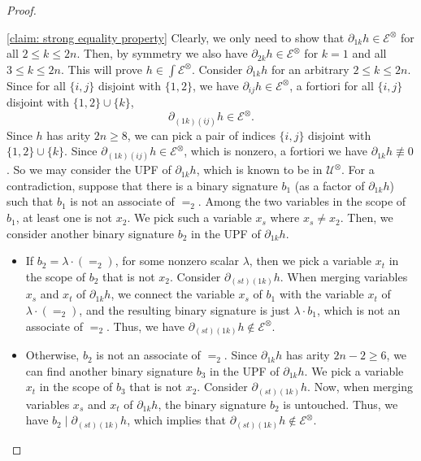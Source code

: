 \begin{proof}
\begin{claimproof}{\cref{claim: strong equality property}}
    Clearly, we only need to show that ${\partial}_{1k}{h}\in {\mathcal{E}}^{\otimes}$ for all $2 \leqslant k \leqslant 2n$. Then, by symmetry we also have ${\partial}_{2k}{h}\in {\mathcal{E}}^{\otimes}$ for $k=1$ and all $3 \leqslant k \leqslant 2n$. This will prove ${h}\in {\int}{\mathcal{E}}^{\otimes}.$
    Consider ${\partial}_{1k}{h}$ for an arbitrary $2\leqslant k \leqslant 2n$.
   Since for all $\{i, j\}$ disjoint with $\{1, 2\}$, we have
    ${\partial}_{ij}{h}\in {\mathcal{E}}^{\otimes}$, a fortiori
    for all  $\{i, j\}$ disjoint with $\{1, 2\} \cup \{k\}$,
    \begin{equation}\label{eqn:partial-1kj-in-sec8}
    \partial_{(1k)(ij)}{h}\in {\mathcal{E}}^{\otimes}.
   \end{equation}
    Since ${h}$ has arity $2n\geqslant 8$, we can pick a pair of indices $\{i, j\}$ disjoint with $\{1, 2\} \cup \{k\}$.
    Since $\partial_{(1k)(ij)}{h}\in {\mathcal{E}}^{\otimes}$, which is nonzero,  a  fortiori  we have
    ${\partial}_{1k}{h} \not \equiv 0$.
    So we may consider  the UPF of ${\partial}_{1k}{h}$,
    which is known to be in ${\mathcal{U}}^{\otimes}$.
    For a contradiction,
    suppose that  there is a binary signature  ${b_1}$ (as a factor of ${\partial}_{1k}{h}$) such that ${b_1}$ is not an associate of $=_2$. 
    Among the two variables in the scope of ${b_1}$,  at least one is not $x_2$. 
    We pick such a variable $x_s$ where $x_s \neq x_2$. 
    Then, we consider another binary signature ${b_2}$ in the UPF of ${\partial}_{1k}{h}$. 
    \begin{itemize}
        \item 
    If ${b_2} =\lambda \cdot (=_2)$, for some  nonzero scalar
    $\lambda$, then we pick a variable $x_t$ in the scope of ${b_2}$ that is not $x_2$. 
    Consider ${\partial}_{(st)(1k)}{h}$. 
    When merging variables $x_s$ and $x_t$ of ${\partial}_{1k}{h}$, 
    we connect the variable $x_s$ of  ${b_1}$ with the variable $x_t$ of $\lambda  \cdot (=_2)$, and the resulting binary signature is just $\lambda \cdot{b_1}$, which is not an associate of $=_2$. 
    Thus, we have ${\partial}_{(st)(1k)}{h}\notin {\mathcal{E}}^{\otimes}$.
    
    \item Otherwise,  ${b_2}$ is not an associate of $=_2$. Since ${\partial}_{1k}{h}$ has arity $2n-2\geqslant 6$, we can find another binary signature ${b_3}$ in the UPF of ${\partial}_{1k}{h}$. 
    We pick a variable $x_t$ in the scope of ${b_3}$ that is not $x_2$. 
    Consider ${\partial}_{(st)(1k)}{h}$. 
    Now, when merging variables $x_s$ and $x_t$ of ${\partial}_{1k}{h}$, 
    the binary signature ${b_2}$ is untouched. 
    Thus, we have ${b_2}\mid {\partial}_{(st)(1k)}{h}$, which implies that ${\partial}_{(st)(1k)}{h}\notin {\mathcal{E}}^{\otimes}$.
   \end{itemize}
   

\end{claimproof}
\end{proof}
